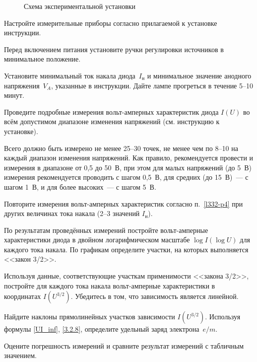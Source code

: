 \begin{figure}[h!]
    \centering
    \caption{Схема экспериментальной установки}
\end{figure}

\begin{lab:task}



    
\item Настройте измерительные приборы согласно прилагаемой к установке
инструкции.

\item Перед включением питания установите ручки регулировки источников
в минимальное положение.

\item Установите минимальный ток накала диода~$I_\text{н}$
и минимальное значение анодного напряжения~$V_{A}$, 
указанные в инструкции. Дайте лампе прогреться в течение 5--10 минут.

\item\label{l332-p4} Проведите подробные измерения вольт-амперных характеристик диода 
$I(U)$ во всём допустимом диапазоне изменения напряжений  (см. инструкцию
к установке). 

Всего должно быть измерено не менее 25--30 точек, 
не менее чем по 8--10 на каждый диапазон изменения напряжений. 
Как правило, рекомендуется провести и измерения в диапазоне от 0,5 до 50~В, 
при этом для малых напряжений (до 5~В) измерения рекомендуется проводить 
с шагом 0,5~В, для средних (до 15~В)~--- с шагом 1~В, и 
для более высоких~--- с шагом 5~В.

\item Повторите измерения вольт-амперных характеристик согласно п.~\ref{l332-p4}
при других величинах тока накала (2--3 значений $I_{н}$).


\item По результатам проведённых измерений постройте 
вольт-амперные характеристики диода 
в двойном логарифмическом масштабе
$\log I (\log U)$
для каждого тока накала. По графикам определите участки, на которых
выполняется <<закон 3/2>>.

\item Используя данные, соответствующие участкам применимости
<<закона 3/2>>, постройте для каждого тока накала вольт-амперные 
характеристики в координатах $I(U^{3/2})$. 
Убедитесь в том, что зависимость является линейной. 

\item Найдите наклоны прямолинейных участков зависимости
$I(U^{3/2})$. Используя формулы \eqref{UI_inf}, \eqref{3.2.8}, 
определите удельный заряд электрона~$e/m$.

\item Оцените погрешность измерений и 
сравните результат измерений с табличным значением.

\end{lab:task}


